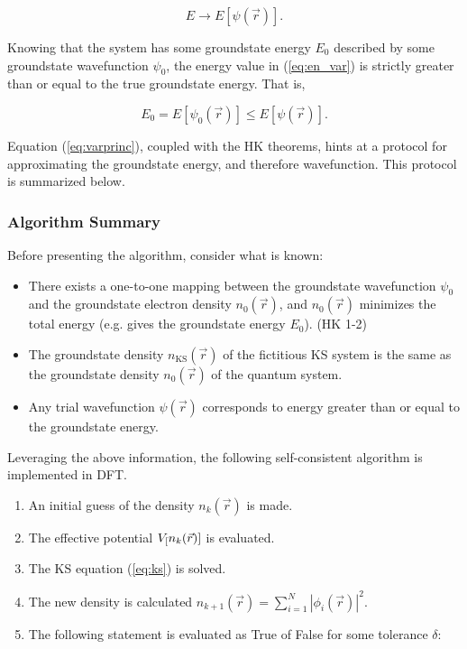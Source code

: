         \begin{equation}
        \label{eq:en_var}
            E \rightarrow E[\psi(\vec{r})].
        \end{equation}
        
        \noindent Knowing that the system has some groundstate energy $E_0$ described by some groundstate wavefunction $\psi_0$, the energy value in (\ref{eq:en_var}) is strictly greater than or equal to the true groundstate energy. That is,
        
        \begin{equation}
            \label{eq:varprinc}
            E_0 = E[\psi_0(\vec{r})] \le E[\psi(\Vec{r})].
        \end{equation}
        
        Equation (\ref{eq:varprinc}), coupled with the HK theorems, hints at a protocol for approximating the groundstate energy, and therefore wavefunction. This protocol is summarized below.
        
        \subsubsection{Algorithm Summary}
        
        Before presenting the algorithm, consider what is known:
        
        \begin{itemize}
            \item There exists a one-to-one mapping between the groundstate wavefunction $\psi_0$ and the groundstate electron density $n_0(\Vec{r})$, and $n_0(\Vec{r})$ minimizes the total energy (e.g. gives the groundstate energy $E_0$). (HK 1-2)
            \item The groundstate density $n_\text{KS}(\Vec{r})$ of the fictitious KS system is the same as the groundstate density $n_0(\Vec{r})$ of the quantum system. 
            \item Any trial wavefunction $\psi(\Vec{r})$ corresponds to energy greater than or equal to the groundstate energy.
        \end{itemize}
        
        \noindent Leveraging the above information, the following self-consistent algorithm is implemented in DFT.
        
        \begin{enumerate}
            \item An initial guess of the density $n_k(\Vec{r})$ is made.
            \item The effective potential $V_\text[n_k(\vec{r})]$ is evaluated.
            \item The KS equation (\ref{eq:ks}) is solved.
            \item The new density is calculated $n_{k+1}(\Vec{r}) = \sum\limits_{i=1}^N |\phi_i(\vec{r})|^2$.
            \item The following statement is evaluated as True of False for some tolerance $\delta$:
        \end{enumerate}
        
